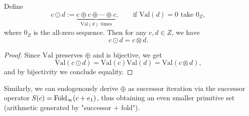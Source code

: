 \begin{theorem}\label{thm:mul-from-add}
Define
$$
c\odot d := \underbrace{c\oplus c\oplus\cdots\oplus c}_{\mathrm{Val}(d)\text{ times}},
\qquad
\text{if }\mathrm{Val}(d)=0\text{ take }0_Z,
$$
where $0_Z$ is the all-zero sequence. Then for any $c,d\in Z$, we have
$$
c\odot d = c\otimes d.
$$
\end{theorem}

\begin{proof}
Since $\mathrm{Val}$ preserves $\oplus$ and is bijective, we get
$$
\mathrm{Val}(c\odot d)=\mathrm{Val}(c)\mathrm{Val}(d)=\mathrm{Val}(c\otimes d),
$$
and by bijectivity we conclude equality.\par
\end{proof}

\begin{remark}\label{rem:succ-smaller-primitives}
Similarly, we can endogenously derive $\oplus$ as successor iteration via the successor operator $S(c)=\mathrm{Fold}_\infty(c+e_1)$, thus obtaining an even smaller primitive set (arithmetic generated by "successor $+$ fold").\par
\end{remark}
